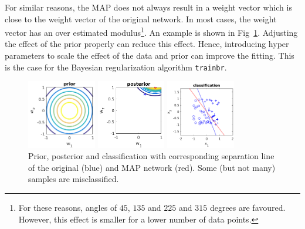 \documentclass[pdftex,11pt,a4paper]{article}
\begin{document}
For similar reasons, the MAP does not always result in a weight vector which is close to the weight vector of the original network. In most cases, the weight vector has an over estimated modulus\footnote{For these reasons, angles of $45$, $135$ and $225$ and $315$ degrees are favoured. However, this effect is smaller for a lower number of data points.}. An example is shown in Fig~\ref{fig:example_perbayes}. Adjusting the effect of the prior properly can reduce this effect. Hence, introducing hyper parameters to scale the effect of the data and prior can improve the fitting. This is the case for the Bayesian regularization algorithm \texttt{trainbr}.
\begin{figure}[htb]
\centering
\begin{minipage}{0.2\textwidth}
\includegraphics[height=3cm]{figs/prior_contour.png}
\end{minipage}%
\begin{minipage}{0.2\textwidth}
\includegraphics[height=3cm]{figs/posterior_contour.png}
\end{minipage}%
\begin{minipage}{0.2\textwidth}
\includegraphics[height=3cm]{figs/separation_line.png}
\end{minipage}%
\caption{Prior, posterior and classification with corresponding separation line of the original (blue) and MAP network (red). Some (but not many) samples are misclassified.\label{fig:example_perbayes}}
\end{figure}
\end{document}
